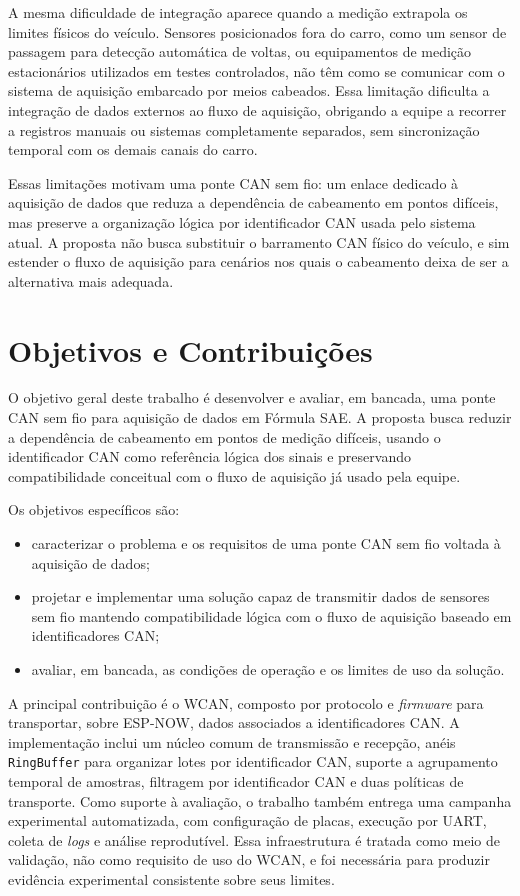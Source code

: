 A mesma dificuldade de integração aparece quando a medição extrapola os limites
físicos do veículo. Sensores posicionados fora do carro, como um sensor de
passagem para detecção automática de voltas, ou equipamentos de medição
estacionários utilizados em testes controlados, não têm como se comunicar com o
sistema de aquisição embarcado por meios cabeados. Essa limitação dificulta a
integração de dados externos ao fluxo de aquisição, obrigando a equipe a
recorrer a registros manuais ou sistemas completamente separados, sem
sincronização temporal com os demais canais do carro.

Essas limitações motivam uma ponte CAN sem fio: um enlace dedicado à aquisição de
dados que reduza a dependência de cabeamento em pontos difíceis, mas preserve a
organização lógica por identificador CAN usada pelo sistema atual. A proposta não
busca substituir o barramento CAN físico do veículo, e sim estender o fluxo de
aquisição para cenários nos quais o cabeamento deixa de ser a alternativa mais
adequada.

\section{Objetivos e Contribuições}

O objetivo geral deste trabalho é desenvolver e avaliar, em bancada, uma ponte CAN
sem fio para aquisição de dados em Fórmula SAE. A proposta busca reduzir a
dependência de cabeamento em pontos de medição difíceis, usando o identificador CAN como referência lógica dos sinais e preservando compatibilidade conceitual com o
fluxo de aquisição já usado pela equipe.

Os objetivos específicos são:

\begin{itemize}
    \item caracterizar o problema e os requisitos de uma ponte CAN sem fio voltada
    à aquisição de dados;
    \item projetar e implementar uma solução capaz de transmitir dados de sensores
    sem fio mantendo compatibilidade lógica com o fluxo de aquisição baseado em
    identificadores CAN;
    \item avaliar, em bancada, as condições de operação e os limites de uso da
    solução.
\end{itemize}

A principal contribuição é o WCAN, composto por protocolo e \emph{firmware} para
transportar, sobre ESP-NOW, dados associados a identificadores CAN. A implementação inclui
um núcleo comum de transmissão e recepção, anéis \texttt{RingBuffer} para
organizar lotes por identificador CAN, suporte a agrupamento temporal de amostras, filtragem
por identificador CAN e duas políticas de transporte. Como suporte
à avaliação, o trabalho também entrega uma campanha experimental automatizada,
com configuração de placas, execução por UART, coleta de \emph{logs} e análise
reprodutível. Essa infraestrutura é tratada como meio de validação, não como
requisito de uso do WCAN, e foi necessária para produzir evidência experimental
consistente sobre seus limites.

